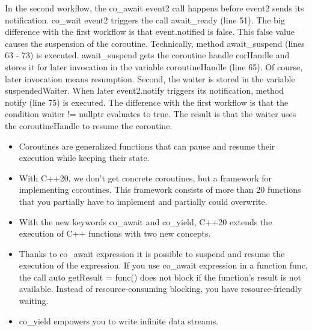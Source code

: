 In the second workflow, the co\_await event2 call happens before event2 sends its notification. co\_wait event2 triggers the call await\_ready (line 51). The big difference with the first workflow is that event.notified is false. This false value causes the suspension of the coroutine. Technically, method await\_suspend (lines 63 - 73) is executed. await\_suspend gets the coroutine handle corHandle and stores it for later invocation in the variable coroutineHandle (line 65). Of course, later invocation means resumption. Second, the waiter is stored in the variable suspendedWaiter. When later event2.notify triggers its notification, method notify (line 75) is executed. The difference with the first workflow is that the condition waiter != nullptr evaluates to true. The result is that the waiter uses the coroutineHandle to resume the coroutine.

\begin{tcolorbox}[colback=mygreen!5!white,colframe=mygreen!75!black,title={Distilled Information}]
	
\begin{itemize}
\item 
Coroutines are generalized functions that can pause and resume their execution while keeping their state.

\item 
With C++20, we don’t get concrete coroutines, but a framework for implementing coroutines. This framework consists of more than 20 functions that you partially have to implement and partially could overwrite.

\item 
With the new keywords co\_await and co\_yield, C++20 extends the execution of C++ functions with two new concepts.

\item 
Thanks to co\_await expression it is possible to suspend and resume the execution of the expression. If you use co\_await expression in a function func, the call auto getResult = func() does not block if the function’s result is not available. Instead of resource-consuming blocking, you have resource-friendly waiting.

\item 
co\_yield empowers you to write infinite data streams.

\end{itemize}

\end{tcolorbox}



























